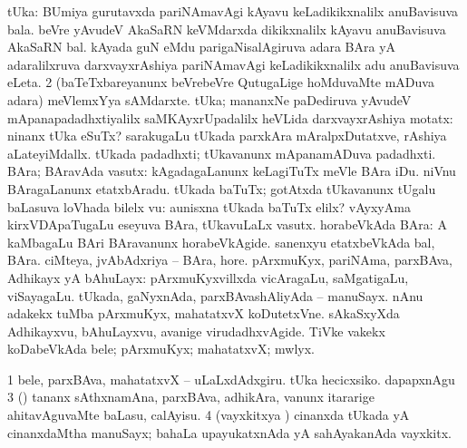{{{\bentry
{} 
\gl{\nA}
\expl{}
\bmng
\bnum
{} tUka: 
\banum
{} BUmiya gurutavxda pariNAmavAgi kAyavu keLadikikxnalilx anuBavisuva bala. 
 beVre yAvudeV AkaSaRN keVMdarxda dikikxnalilx kAyavu anuBavisuva AkaSaRN bal. 
 kAyada guN eMdu parigaNisalAgiruva adara BAra yA adaralilxruva darxvayxrAshiya pariNAmavAgi keLadikikxnalilx adu anuBavisuva eLeta. 
\eanum
\numie
\num{2} (baTeTxbareyanunx beVrebeVre QutugaLige hoMduvaMte mADuva adara) meVlemxYya sAMdarxte. 
\banum
{} tUka; mananxNe paDediruva yAvudeV mApanapadadhxtiyalilx saMKAyxrUpadalilx heVLida darxvayxrAshiya motatx:  ninanx tUka eSuTx?  sarakugaLu tUkada parxkAra mAralpxDutatxve, rAshiya aLateyiMdallx. 
 tUkada padadhxti; tUkavanunx mApanamADuva padadhxti. 
 BAra; BAravAda vasutx:  kAgadagaLanunx keLagiTuTx meVle BAra iDu.  niVnu BAragaLanunx etatxbAradu. 
 tUkada baTuTx; gotAtxda tUkavanunx tUgalu baLasuva loVhada bilelx \mo vu:  aunisxna tUkada baTuTx elilx? 
 vAyxyAma kirxVDApaTugaLu eseyuva BAra, tUkavuLaLx vasutx. 
\eanum
\numie
{} 
\banum
{} horabeVkAda BAra:  A kaMbagaLu BAri BAravanunx horabeVkAgide. 
 sanenxyu etatxbeVkAda bal, BAra. 
 ciMteya, jvAbAdxriya -- BAra, hore. 
\eanum
\numie
{} 
\banum
{} pArxmuKyx, pariNAma, parxBAva, Adhikayx yA bAhuLayx:  pArxmuKyxvillxda vicAragaLu, saMgatigaLu, viSayagaLu.  tUkada, gaNyxnAda, parxBAvashAliyAda -- manuSayx.  nAnu adakekx tuMba pArxmuKyx, mahatatxvX koDutetxVne.  sAkaSxyXda Adhikayxvu, bAhuLayxvu, avanige virudadhxvAgide. 
 TiVke \mo vakekx koDabeVkAda bele; pArxmuKyx; mahatatxvX; mwlyx. 
\eanum
\numie
\enum
\emng

\noindent 
\gl{\pagu}
\expl{}
\bmng
\bnum
\num{1}  bele, parxBAva, mahatatxvX -- uLaLxdAdxgiru. 
  
\banum
{} tUka hecicxsiko. 
 dapapxnAgu 
\eanum
\numie
\num{3}  (\AmA) tananx sAthxnamAna, parxBAva, adhikAra, \mo vanunx itararige ahitavAguvaMte baLasu, calAyisu. 
\num{4}  (vayxkitxya \vi) cinanxda tUkada yA cinanxdaMtha manuSayx; bahaLa upayukatxnAda yA sahAyakanAda vayxkitx. 
\enum
\emng
\eentry

}}}
